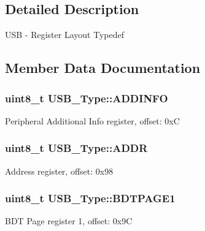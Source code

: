 \subsection{Detailed Description}
U\+SB -\/ Register Layout Typedef 

\subsection{Member Data Documentation}
\subsubsection[{\texorpdfstring{A\+D\+D\+I\+N\+FO}{ADDINFO}}]{ uint8\+\_\+t U\+S\+B\+\_\+\+Type\+::\+A\+D\+D\+I\+N\+FO}\hypertarget{structUSB__Type_a7271c06f949d448fa10196e2bb10bd93}{}\label{structUSB__Type_a7271c06f949d448fa10196e2bb10bd93}
Peripheral Additional Info register, offset\+: 0xC 
\subsubsection[{\texorpdfstring{A\+D\+DR}{ADDR}}]{ uint8\+\_\+t U\+S\+B\+\_\+\+Type\+::\+A\+D\+DR}\hypertarget{structUSB__Type_a8705f1ca0cd919f17cdd610a401de206}{}\label{structUSB__Type_a8705f1ca0cd919f17cdd610a401de206}
Address register, offset\+: 0x98 
\subsubsection[{\texorpdfstring{B\+D\+T\+P\+A\+G\+E1}{BDTPAGE1}}]{ uint8\+\_\+t U\+S\+B\+\_\+\+Type\+::\+B\+D\+T\+P\+A\+G\+E1}\hypertarget{structUSB__Type_ae38659ba2c226f6bbe8618f9a2437ba3}{}\label{structUSB__Type_ae38659ba2c226f6bbe8618f9a2437ba3}
B\+DT Page register 1, offset\+: 0x9C 
